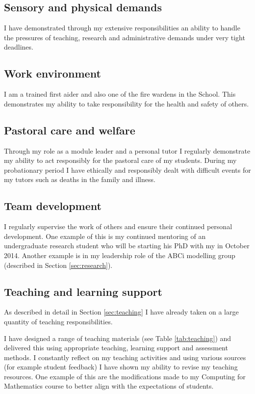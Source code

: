 \documentclass{article}
\begin{document}
\subsection{Sensory and physical demands}

I have demonstrated through my extensive responsibilities an ability to handle the pressures of teaching, research and administrative demands under very tight deadlines.

\subsection{Work environment}

I am a trained first aider and also one of the fire wardens in the School.
This demonstrates my ability to take responsibility for the health and safety of others.

\subsection{Pastoral care and welfare}

Through my role as a module leader and a personal tutor I regularly demonstrate my ability to act responsibly for the pastoral care of my students.
During my probationary period I have ethically and responsibly dealt with difficult events for my tutors such as deaths in the family and illness.

\subsection{Team development}

I regularly supervise the work of others and ensure their continued personal development.
One example of this is my continued mentoring of an undergraduate research student who will be starting his PhD with my in October 2014.
Another example is in my leadership role of the ABCi modelling group (described in Section \ref{sec:research}).

\subsection{Teaching and learning support}

As described in detail in Section \ref{sec:teaching} I have already taken on a large quantity of teaching responsibilities.

I have designed a range of teaching materials (see Table \ref{tab:teaching}) and delivered this using appropriate teaching, learning support and assessment methods.
I constantly reflect on my teaching activities and using various sources (for example student feedback) I have shown my ability to revise my teaching resources.
One example of this are the modifications made to my Computing for Mathematics course to better align with the expectations of students.
\end{document}
